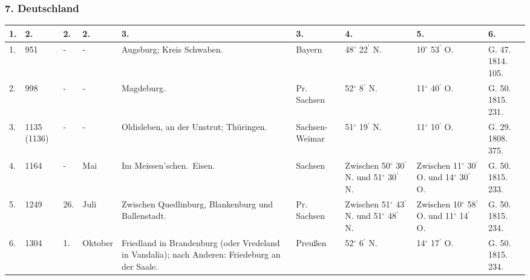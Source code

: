 \documentclass[a4paper, 11pt, oneside, polutonikogreek, german]{article}
\begin{document}
\begin{landscape}
\subsubsection{7. Deutschland}
\begin{table}[!ht]
    \centering
    \begin{tabular}{|p{5mm}|p{9mm}|p{5mm}|p{15mm}|p{48mm}|p{20mm}|p{18mm}|p{18mm}|p{11mm}|}
    \hline
        1. & 2. & 2. & 2. & 3. & 3. & 4. & 5. & 6. \\ \hline
        1. & 951 & - & - & Augsburg; Kreis Schwaben. & Bayern & 48$^\circ$ 22$^\prime$ N. & 10$^\circ$ 53$^\prime$ O. & G. 47. 1814. 105. \\ \hline
        2. & 998 & - & - & Magdeburg. & Pr. Sachsen & 52$^\circ$ 8$^\prime$ N. & 11$^\circ$ 40$^\prime$ O. & G. 50. 1815. 231. \\ \hline
        3. & 1135 (1136) & - & - & Oldisleben, an der Unstrut; Thüringen. & Sachsen-Weimar & 51$^\circ$ 19$^\prime$ N. & 11$^\circ$ 10$^\prime$ O. & G. 29. 1808. 375. \\ \hline
        4. & 1164 & - & Mai & Im Meissen’schen. Eisen. & Sachsen & Zwischen 50$^\circ$ 30$^\prime$ N. und 51$^\circ$ 30$^\prime$ N. & Zwischen 11$^\circ$ 30$^\prime$ O. und 14$^\circ$ 30$^\prime$ O. & G. 50. 1815. 233. \\ \hline
        5. & 1249 & 26. & Juli & Zwischen Quedlinburg, Blankenburg und Ballenstadt. & Pr. Sachsen & Zwischen 51$^\circ$ 43$^\prime$ N. und 51$^\circ$ 48$^\prime$ N. & Zwischen 10$^\circ$ 58$^\prime$ O. und 11$^\circ$ 14$^\prime$ O. & G. 50. 1815. 234. \\ \hline
        6. & 1304 & 1. & Oktober & Friedland in Brandenburg (oder Vredeland in Vandalia); nach Anderen: Friedeburg an der Saale. & Preußen & 52$^\circ$ 6$^\prime$ N. & 14$^\circ$ 17$^\prime$ O. & G. 50. 1815. 234. \\ \hline
    \end{tabular}
\end{table}
\end{landscape}
\clearpage
\end{document}
